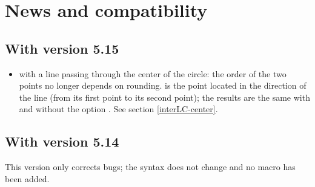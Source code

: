 \section{News and compatibility}\label{news}

\subsection{With version 5.15}
\begin{itemize}
  \item {} with a line passing through the center of the circle: the order of the two points no longer depends on rounding.  is the point located in the direction of the line (from its first point to its second point); the results are the same with and without the option . See section \ref{interLC-center}.
\end{itemize}

\subsection{With version 5.14}
\begingroup\sloppy

This version only corrects bugs; the syntax does not change and no macro has been added.

